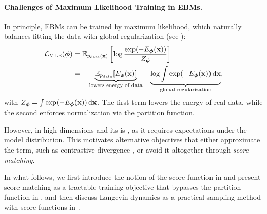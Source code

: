\paragraph{Challenges of Maximum Likelihood Training in EBMs.}
In principle, EBMs can be trained by maximum likelihood, which naturally balances fitting the data with global regularization (see ):
\begin{align}
\label{eq:mle-ebm}
\mathcal{L}_{\text{MLE}}({\bm{\phi}}) 
&= \mathbb{E}_{p_{\text{data}}({\mathbf{x}})}  \left[ \log \frac{\exp(-E_{{\bm{\phi}}}({\mathbf{x}}))}{Z_{\bm{\phi}}} \right] \\
&= -  \underbrace{\mathbb{E}_{p_{\text{data}}}[E_{{\bm{\phi}}}({\mathbf{x}})]}_{\text{lowers energy of data}}
   -  \underbrace{\log \int \exp(-E_{{\bm{\phi}}}({\mathbf{x}}))\mathop{}\!\mathrm{d}{\mathbf{x}}}_{\text{global regularization}}, \nonumber
\end{align}
with $Z_{\bm{\phi}} = \int \exp(-E_{\bm{\phi}}({\mathbf{x}}))\mathop{}\!\mathrm{d}{\mathbf{x}}$. 
The first term lowers the energy of real data, while the second enforces normalization via the partition function.

However, in high dimensions  and its  is , as it requires expectations under the model distribution. 
This motivates alternative objectives that either approximate the term, such as contrastive divergence \citep{hinton2002training}, or avoid it altogether through \emph{score matching}. 

In what follows, we first introduce the notion of the score function in  and present score matching as a tractable training objective that bypasses the partition function in , and then discuss Langevin dynamics as a practical sampling method with score functions in . 












